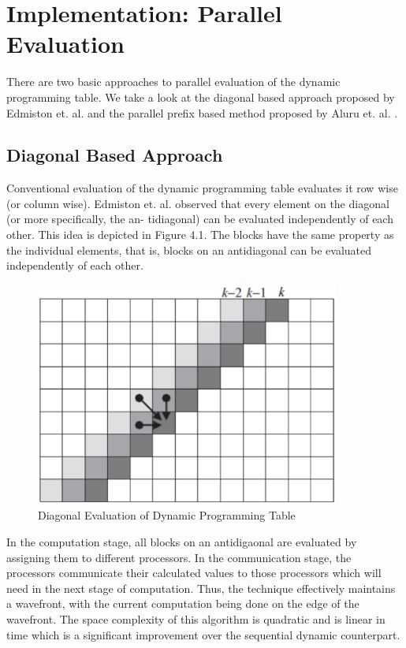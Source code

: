 \documentclass[a4paper,11pt]{report}
\begin{document}
\chapter{Implementation: Parallel Evaluation}
There are two basic approaches to parallel evaluation of the dynamic programming table. We take
a look at the diagonal based approach proposed by Edmiston et. al.  and the parallel prefix based
method proposed by Aluru et. al. .
\section{Diagonal Based Approach}
Conventional evaluation of the dynamic programming table evaluates it row wise (or column wise).
Edmiston et. al.  observed that every element on the diagonal (or more specifically, the an-
tidiagonal) can be evaluated independently of each other. This idea is depicted in Figure 4.1.
The blocks have the same property as the individual elements, that is, blocks on an antidiagonal can be evaluated
independently of each other. \begin{figure}
  \begin{center}
    \includegraphics[width=10cm]{images/fig2}
    \caption{Diagonal Evaluation of Dynamic Programming Table}
    \label{fig:}
  \end{center}
\end{figure}

In the computation stage, all blocks on an antidigaonal are evaluated by
assigning them to different processors. In the communication stage, the processors communicate
their calculated values to those processors which will need in the next stage of computation. Thus,
the technique effectively maintains a wavefront, with the current computation being done on the
edge of the wavefront.
The space complexity of this algorithm is quadratic and is linear in time which is a significant improvement over the sequential dynamic counterpart.
\end{document}
